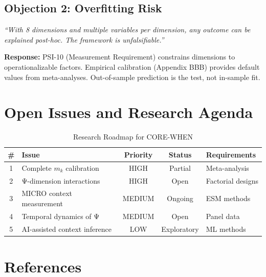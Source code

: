 \subsection{Objection 2: Overfitting Risk}

\begin{tcolorbox}[colback=red!5!white, colframe=red!50!black,
    title=Objection: Too Many Free Parameters]
\textit{``With 8 dimensions and multiple variables per dimension, any outcome
can be explained post-hoc. The framework is unfalsifiable.''}
\end{tcolorbox}

\textbf{Response:}
PSI-10 (Measurement Requirement) constrains dimensions to operationalizable factors.
Empirical calibration (Appendix BBB) provides default values from meta-analyses.
Out-of-sample prediction is the test, not in-sample fit.


\section{Open Issues and Research Agenda}
\label{sec:when-open}

\begin{table}[htbp]
\centering
\caption{Research Roadmap for CORE-WHEN}
\label{tab:when-roadmap}
\renewcommand{\arraystretch}{1.3}
\begin{tabular}{@{}clccl@{}}
\toprule
\textbf{\#} & \textbf{Issue} & \textbf{Priority} & \textbf{Status} & \textbf{Requirements} \\
\midrule
1 & Complete $m_k$ calibration & HIGH & Partial & Meta-analysis \\
2 & Ψ-dimension interactions & HIGH & Open & Factorial designs \\
3 & MICRO context measurement & MEDIUM & Ongoing & ESM methods \\
4 & Temporal dynamics of Ψ & MEDIUM & Open & Panel data \\
5 & AI-assisted context inference & LOW & Exploratory & ML methods \\
\bottomrule
\end{tabular}
\end{table}


\section{References}
\label{sec:when-references}


